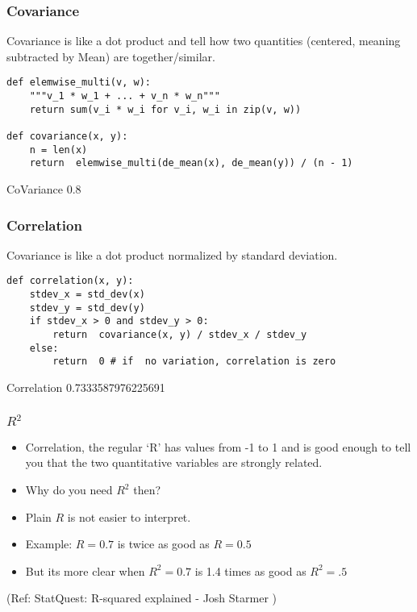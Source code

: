\begin{frame}[fragile]\frametitle{Covariance}
Covariance is like a dot product and tell how two quantities (centered, meaning subtracted by Mean) are together/similar.
\begin{lstlisting}
def elemwise_multi(v, w):
    """v_1 * w_1 + ... + v_n * w_n"""
    return sum(v_i * w_i for v_i, w_i in zip(v, w))

def covariance(x, y):
	n = len(x)
	return	elemwise_multi(de_mean(x), de_mean(y)) / (n - 1)

\end{lstlisting}
CoVariance 0.8
\end{frame}

\begin{frame}[fragile]\frametitle{Correlation}
Covariance is like a dot product normalized by standard deviation.
\begin{lstlisting}
def correlation(x, y):
	stdev_x = std_dev(x)
  	stdev_y = std_dev(y)
	if stdev_x > 0 and stdev_y > 0:
		return	covariance(x, y) / stdev_x / stdev_y
	else:
		return	0 # if	no variation, correlation is zero
\end{lstlisting}
Correlation 0.7333587976225691
\end{frame}

\begin{frame}[fragile]\frametitle{$R^2$}

	\begin{itemize}
	\item Correlation, the regular `R' has values from -1 to 1 and is good enough to tell you that the two quantitative variables are strongly related.
	\item Why do you need $R^2$ then?
	\item Plain $R$ is not easier to interpret. 
	\item Example: $R=0.7$ is twice as good as $R=0.5$
	\item But its more clear when $R^2 = 0.7$ is 1.4 times as good as $R^2=.5$
	\end{itemize}
  
\tiny{(Ref: StatQuest: R-squared explained - Josh Starmer )}
\end{frame}

